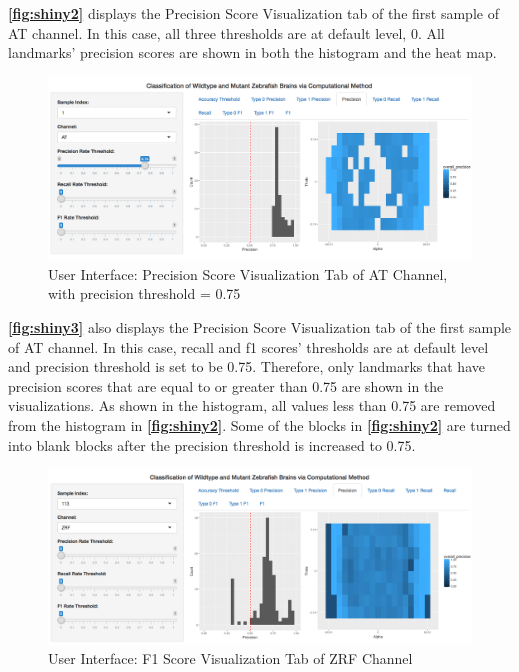 \documentclass[10pt,letterpaper]{article}
\begin{document}
\textbf{\autoref{fig:shiny2}} displays the Precision Score Visualization
tab of the first sample of AT channel. In this case, all three
thresholds are at default level, 0. All landmarks' precision scores are
shown in both the histogram and the heat map.

\begin{figure}[h]

{\centering \includegraphics[width=4.9in]{figures/shiny3} 

}

\caption{\label{fig:shiny3} User Interface: Precision Score Visualization Tab of AT Channel, with precision threshold = 0.75}\label{fig:unnamed-chunk-12}
\end{figure}

\textbf{\autoref{fig:shiny3}} also displays the Precision Score
Visualization tab of the first sample of AT channel. In this case,
recall and f1 scores' thresholds are at default level and precision
threshold is set to be 0.75. Therefore, only landmarks that have
precision scores that are equal to or greater than 0.75 are shown in the
visualizations. As shown in the histogram, all values less than 0.75 are
removed from the histogram in \textbf{\autoref{fig:shiny2}}. Some of the
blocks in \textbf{\autoref{fig:shiny2}} are turned into blank blocks
after the precision threshold is increased to 0.75.

\begin{figure}[h]

{\centering \includegraphics[width=5.04in]{figures/shiny8} 

}

\caption{\label{fig:shiny8} User Interface: F1 Score Visualization Tab of ZRF Channel}\label{fig:unnamed-chunk-13}
\end{figure}
\end{document}
